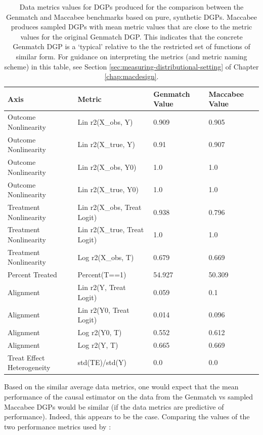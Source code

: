 \documentclass[../main.tex]{subfiles}
\begin{document}
\begin{table}[ht!]
\centering
    \begin{tabular}{|l|l|m{1.5cm}|m{1.5cm}|}
    \hline
    \rowcolor[HTML]{EFEFEF} 
    Axis & Metric & Genmatch Value & Maccabee Value \\ \hline
    Outcome Nonlinearity & Lin r2(X\_obs, Y) & 0.909 & 0.905 \\ \hline
    Outcome Nonlinearity & Lin r2(X\_true, Y) & 0.91 & 0.907 \\ \hline
    Outcome Nonlinearity & Lin r2(X\_obs, Y0) & 1.0 & 1.0 \\ \hline
    Outcome Nonlinearity & Lin r2(X\_true, Y0) & 1.0 & 1.0 \\ \hline
    Treatment Nonlinearity & Lin r2(X\_obs, Treat Logit) & 0.938 & 0.796 \\ \hline
    Treatment Nonlinearity & Lin r2(X\_true, Treat Logit) & 1.0 & 1.0 \\ \hline
    Treatment Nonlinearity & Log r2(X\_obs, T) & 0.679 & 0.669 \\ \hline
    Percent Treated & Percent(T==1) & 54.927 & 50.309 \\ \hline
    Alignment & Lin r2(Y, Treat Logit) & 0.059 & 0.1 \\ \hline
    Alignment & Lin r2(Y0, Treat Logit) & 0.014 & 0.096 \\ \hline
    Alignment & Log r2(Y0, T) & 0.552 & 0.612 \\ \hline
    Alignment & Log r2(Y, T) & 0.665 & 0.669 \\ \hline
    Treat Effect Heterogeneity & std(TE)/std(Y) & 0.0 & 0.0 \\ \hline
    \end{tabular}
    \caption{Data metrics values for DGPs produced for the comparison between the Genmatch and Maccabee benchmarks based on pure, synthetic DGPs. Maccabee produces sampled DGPs with mean metric values that are close to the metric values for the original Genmatch DGP. This indicates that the concrete Genmatch DGP is a `typical' relative to the the restricted set of functions of similar form. For guidance on interpreting the metrics (and metric naming scheme) in this table, see Section \ref{sec:measuring-distributional-setting} of Chapter \ref{chap:macdesign}.}
    \label{tbl:pure-synth-data-metrics-1}
\end{table}
\FloatBarrier

Based on the similar average data metrics, one would expect that the mean performance of the causal estimator on the data from the Genmatch vs sampled Maccabee DGPs would be similar (if the data metrics are predictive of performance). Indeed, this appears to be the case. Comparing the values of the two performance metrics used by \citeauthor{Diamond2013GeneticStudies}:
\end{document}
